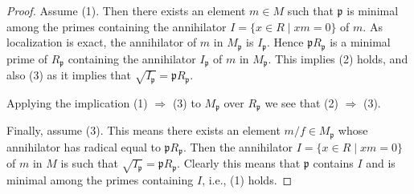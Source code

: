 \documentclass[10pt,a4paper]{amsart}
\theoremstyle{plain}
\theoremstyle{definition}
\theoremstyle{remark}
\numberwithin{equation}{subsection}
\begin{document}
\begin{proof}
Assume (1). Then there exists an element $m \in M$ such that
$\mathfrak p$ is minimal among the primes containing the annihilator
$I = \{x \in R \mid xm = 0\}$ of $m$. As localization is exact, the
annihilator of $m$ in $M_{\mathfrak p}$ is $I_{\mathfrak p}$.
Hence $\mathfrak pR_{\mathfrak p}$ is a minimal prime of
$R_{\mathfrak p}$ containing the annihilator $I_{\mathfrak p}$
of $m$ in $M_{\mathfrak p}$. This implies (2) holds, and also (3)
as it implies that $\sqrt{I_{\mathfrak p}} = \mathfrak pR_{\mathfrak p}$.

\medskip\noindent
Applying the implication (1) $\Rightarrow$ (3) to $M_{\mathfrak p}$
over $R_{\mathfrak p}$ we see that (2) $\Rightarrow$ (3).

\medskip\noindent
Finally, assume (3). This means there exists an element
$m/f \in M_{\mathfrak p}$ whose annihilator has radical equal
to $\mathfrak pR_{\mathfrak p}$. Then the annihilator
$I = \{x \in R \mid xm = 0\}$ of $m$ in $M$ is such that
$\sqrt{I_{\mathfrak p}} = \mathfrak pR_{\mathfrak p}$. Clearly
this means that $\mathfrak p$ contains $I$ and is minimal among the
primes containing $I$, i.e., (1) holds.
\end{proof}
\end{document}
